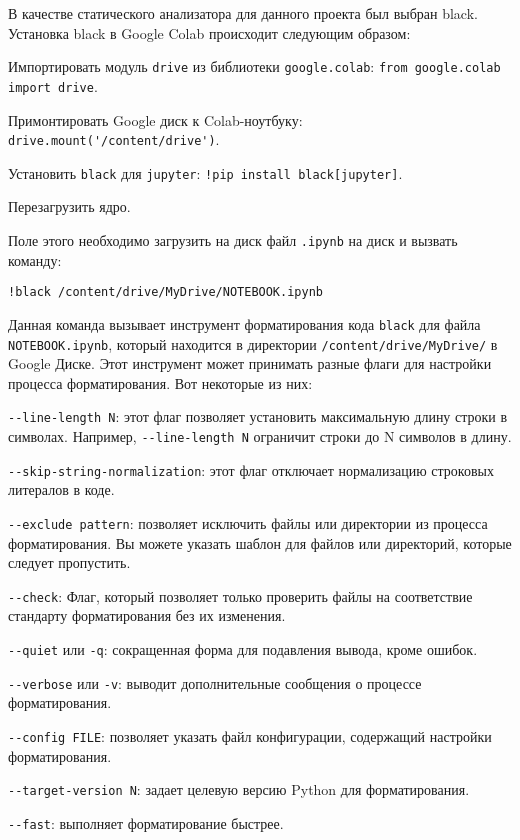 В качестве статического анализатора для данного проекта был выбран 
black. Установка black в Google Colab происходит следующим образом:

\begin{enumerate_num}
    \item Импортировать модуль \lstinline{drive} из библиотеки \lstinline{google.colab}: \lstinline{from google.colab import drive}.
    \item Примонтировать Google диск к Colab-ноутбуку: \lstinline{drive.mount('/content/drive')}.
    \item Установить \lstinline{black} для \lstinline{jupyter}: \lstinline{!pip install black[jupyter]}.
    \item Перезагрузить ядро.
\end{enumerate_num}

Поле этого необходимо загрузить на диск файл \lstinline{.ipynb} на диск и вызвать команду:

\begin{lstlisting}[basicstyle=\ttfamily\small]
    !black /content/drive/MyDrive/NOTEBOOK.ipynb
\end{lstlisting}

Данная команда вызывает инструмент форматирования кода \lstinline{black} для файла \lstinline{NOTEBOOK.ipynb}, который находится в директории \lstinline{/content/drive/MyDrive/} в Google Диске. Этот инструмент может принимать разные флаги для настройки процесса форматирования. Вот некоторые из них:

\begin{enumerate_num}
    \item \lstinline{--line-length N}: этот флаг позволяет установить максимальную длину строки в символах. Например, \lstinline{--line-length N} ограничит строки до N символов в длину.
    \item \lstinline{--skip-string-normalization}: этот флаг отключает нормализацию строковых литералов в коде.
    \item \lstinline{--exclude pattern}: позволяет исключить файлы или директории из процесса форматирования. Вы можете указать шаблон для файлов или директорий, которые следует пропустить.
    \item \lstinline{--check}: Флаг, который позволяет только проверить файлы на соответствие стандарту форматирования без их изменения.
    \item \lstinline{--quiet} или \lstinline{-q}: сокращенная форма для подавления вывода, кроме ошибок.
    \item \lstinline{--verbose} или \lstinline{-v}: выводит дополнительные сообщения о процессе форматирования.
    \item \lstinline{--config FILE}: позволяет указать файл конфигурации, содержащий настройки форматирования.
    \item \lstinline{--target-version N}: задает целевую версию Python для форматирования.
    \item \lstinline{--fast}: выполняет форматирование быстрее.
\end{enumerate_num}

